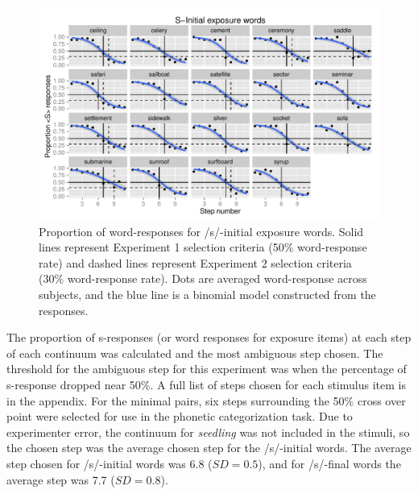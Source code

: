 \begin{figure}
\includegraphics[width=\textwidth]{sinitialpretest.pdf}
\caption{Proportion of word-responses for /s/-initial exposure words. Solid lines represent Experiment 1 selection criteria (50\% word-response rate) and dashed lines represent Experiment 2 selection criteria (30\% word-response rate).  Dots are averaged word-response across subjects, and the blue line is a binomial model constructed from the responses.}
\end{figure}

The proportion of s-responses (or word responses for exposure items) at each step of each continuum was calculated and the most ambiguous step chosen.  The threshold for the ambiguous step for this experiment was when the percentage of s-response dropped near 50\%. A full list of steps chosen for each stimulus item is in the appendix.  For the minimal pairs, six steps surrounding the 50\% cross over point were selected for use in the phonetic categorization task.  Due to experimenter error, the continuum for \emph{seedling} was not included in the stimuli, so the chosen step was the average chosen step for the /s/-initial words.  The average step chosen for /s/-initial words was 6.8 ($SD = 0.5$), and for /s/-final words the average step was 7.7 ($SD = 0.8$).

